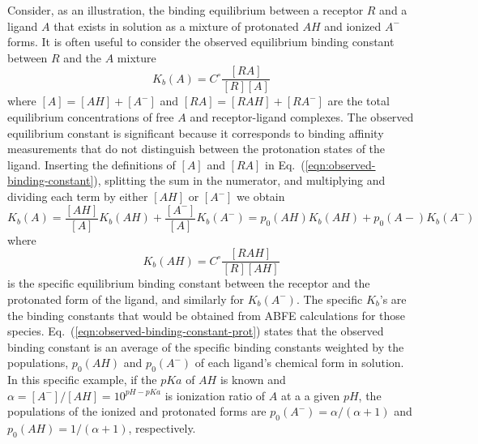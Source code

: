 \documentclass[9pt,bestpractices,pubversion]{livecoms}
\begin{document}
Consider, as an illustration, the binding equilibrium between a receptor $R$ and a ligand $A$ that exists in solution as a mixture of protonated $AH$ and ionized $A^-$ forms. It is often useful to consider the observed equilibrium binding constant between $R$ and the $A$ mixture 
\begin{equation}
  K_b(A) = C^\circ \frac{[RA]}{[R][A]}
  \label{eqn:observed-binding-constant}
\end{equation}
where $[A] = [AH] + [A^-]$ and $[RA] = [RAH] + [RA^-]$ are the total equilibrium concentrations of free $A$ and receptor-ligand complexes. The observed equilibrium constant is significant because it corresponds to binding affinity measurements that do not distinguish between the protonation states of the ligand. Inserting the definitions of $[A]$ and $[RA]$ in Eq.~(\ref{eqn:observed-binding-constant}), splitting the sum in the numerator, and multiplying and dividing each term by either $[AH]$ or $[A^-]$ we obtain
\begin{equation}
  K_b(A) = \frac{[AH]}{[A]}  K_b(AH) +  \frac{[A^-]}{[A]} K_b(A^-) =  p_0(AH) K_b(AH) +  p_0(A-) K_b(A^-)
  \label{eqn:observed-binding-constant-split}
\end{equation}
where
\begin{equation}
  K_b(AH) = C^\circ \frac{[RAH]}{[R][AH]}
  \label{eqn:observed-binding-constant-prot}
\end{equation}
is the specific equilibrium binding constant between the receptor and the protonated form of the ligand, and similarly for $K_b(A^-)$. The specific $K_b$'s are the binding constants that would be obtained from ABFE calculations for those species. Eq.~(\ref{eqn:observed-binding-constant-prot}) states that the observed binding constant is an average of the specific binding constants weighted by the populations, $p_0(AH)$ and  $p_0(A^-)$ of each ligand's chemical form in solution. In this specific example, if the $pKa$ of $AH$ is known and $\alpha = [A^-]/[AH] = 10^{pH-pKa} $ is ionization ratio of $A$ at a a given $pH$, the populations of the ionized and protonated forms are $p_0(A^-) = \alpha/(\alpha+1)$ and $p_0(AH) = 1/(\alpha+1)$, respectively.\cite{champion2024multistate,azimi2022application}
\end{document}
